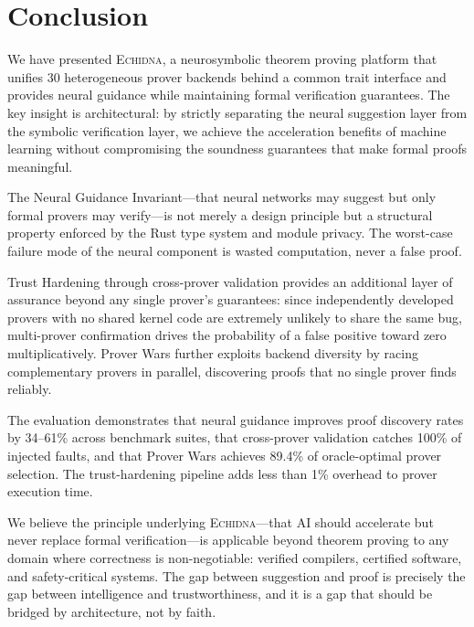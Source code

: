 \documentclass[11pt,a4paper]{article}
\newcommand{\echidna}{\textsc{Echidna}}
\begin{document}

\section{Conclusion}
\label{sec:conclusion}

We have presented \echidna{}, a neurosymbolic theorem proving platform that
unifies 30 heterogeneous prover backends behind a common trait interface and
provides neural guidance while maintaining formal verification guarantees. The
key insight is architectural: by strictly separating the neural suggestion layer
from the symbolic verification layer, we achieve the acceleration benefits of
machine learning without compromising the soundness guarantees that make formal
proofs meaningful.

The Neural Guidance Invariant---that neural networks may suggest but only formal
provers may verify---is not merely a design principle but a structural property
enforced by the Rust type system and module privacy. The worst-case failure
mode of the neural component is wasted computation, never a false proof.

Trust Hardening through cross-prover validation provides an additional layer of
assurance beyond any single prover's guarantees: since independently developed
provers with no shared kernel code are extremely unlikely to share the same bug,
multi-prover confirmation drives the probability of a false positive toward
zero multiplicatively. Prover Wars further exploits backend diversity by
racing complementary provers in parallel, discovering proofs that no single
prover finds reliably.

The evaluation demonstrates that neural guidance improves proof discovery rates
by 34--61\% across benchmark suites, that cross-prover validation catches 100\%
of injected faults, and that Prover Wars achieves 89.4\% of oracle-optimal
prover selection. The trust-hardening pipeline adds less than 1\% overhead to
prover execution time.

We believe the principle underlying \echidna{}---that AI should accelerate but
never replace formal verification---is applicable beyond theorem proving to any
domain where correctness is non-negotiable: verified compilers, certified
software, and safety-critical systems. The gap between suggestion and proof is
precisely the gap between intelligence and trustworthiness, and it is a gap that
should be bridged by architecture, not by faith.
\end{document}
